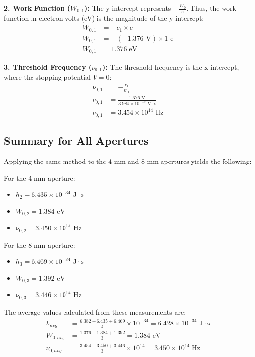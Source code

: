 \documentclass[12pt, a4paper]{article}
\begin{document}
\textbf{2. Work Function ($W_{0,1}$):}
The y-intercept represents $-\frac{W_0}{e}$. Thus, the work function in electron-volts (eV) is the magnitude of the y-intercept:
\begin{align*}
    W_{0,1} &= -c_1 \times e \\
    W_{0,1} &= -(-1.376 \text{ V}) \times 1 \text{ e} \\
    W_{0,1} &= 1.376 \text{ eV}
\end{align*}

\textbf{3. Threshold Frequency ($\nu_{0,1}$):}
The threshold frequency is the x-intercept, where the stopping potential $V = 0$:
\begin{align*}
    \nu_{0,1} &= -\frac{c_1}{m_1} \\
    \nu_{0,1} &= \frac{1.376 \text{ V}}{3.984 \times 10^{-15} \text{ V}\cdot\text{s}} \\
    \nu_{0,1} &= 3.454 \times 10^{14} \text{ Hz}
\end{align*}

\subsection*{Summary for All Apertures}
Applying the same method to the 4 mm and 8 mm apertures yields the following:

For the 4 mm aperture:
\begin{itemize}
    \item $h_2 = 6.435 \times 10^{-34} \text{ J}\cdot\text{s}$
    \item $W_{0,2} = 1.384 \text{ eV}$
    \item $\nu_{0,2} = 3.450 \times 10^{14} \text{ Hz}$
\end{itemize}

For the 8 mm aperture:
\begin{itemize}
    \item $h_3 = 6.469 \times 10^{-34} \text{ J}\cdot\text{s}$
    \item $W_{0,3} = 1.392 \text{ eV}$
    \item $\nu_{0,3} = 3.446 \times 10^{14} \text{ Hz}$
\end{itemize}

The average values calculated from these measurements are:
\begin{align*}
    h_{avg} &= \frac{6.382 + 6.435 + 6.469}{3} \times 10^{-34} = 6.428 \times 10^{-34} \text{ J}\cdot\text{s} \\
    W_{0,avg} &= \frac{1.376 + 1.384 + 1.392}{3} = 1.384 \text{ eV} \\
    \nu_{0,avg} &= \frac{3.454 + 3.450 + 3.446}{3} \times 10^{14} = 3.450 \times 10^{14} \text{ Hz}
\end{align*}
\end{document}
